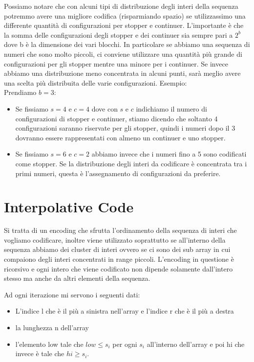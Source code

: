 \documentclass[14pt]{extreport}
\begin{document}
Possiamo notare che con alcuni tipi di distribuzione degli interi della sequenza potremmo avere una migliore codifica (risparmiando spazio) se utilizzassimo una differente quantità di configurazioni per stopper e continuer.
L'importante è che la somma delle configurazioni degli stopper e dei continuer sia sempre pari a $2^b$ dove b è la dimensione dei vari blocchi.
In particolare se abbiamo una sequenza di numeri che sono molto piccoli, ci conviene utilizzare una quantità più grande di configurazioni per gli stopper mentre una minore per i continuer.
Se invece abbiamo una distribuzione meno concentrata in alcuni punti, sarà meglio avere una scelta più distribuita delle varie configurazioni. 
Esempio:\\
Prendiamo $b=3$:
\begin{itemize}
\item Se fissiamo $s=4$ e $c=4$ dove con $s$ e $c$ indichiamo il numero di configurazioni di stopper e continuer, stiamo dicendo che soltanto 4 configurazioni saranno riservate per gli stopper, quindi i numeri dopo il 3 dovranno essere rappresentati con almeno un continuer e uno stopper.
\item Se fissiamo $s=6$ e $c=2$ abbiamo invece che i numeri fino a 5 sono codificati come stopper. Se la distribuzione degli interi da codificare è concentrata tra i primi numeri, questa è l'assegnamento di configurazioni da preferire.
\end{itemize}

\section{Interpolative Code}

Si tratta di un encoding che sfrutta l'ordinamento della sequenza di interi che vogliamo codificare, inoltre viene utilizzato soprattutto se all'interno della sequenza abbiamo dei cluster di interi ovvero se ci sono dei sub array in cui compaiono degli interi concentrati in range piccoli.
L'encoding in questione è ricorsivo e ogni intero che viene codificato non dipende solamente dall'intero stesso ma anche da altri elementi della sequenza.

Ad ogni iterazione mi servono i seguenti dati:

\begin{itemize}
\item L'indice l che è il più a sinistra nell'array e l'indice r che è il più a destra
\item la lunghezza n dell'array
\item l'elemento low tale che $low \leq s_i$ per ogni $s_i$ all'interno dell'array e poi hi che invece è tale che $hi \geq s_i$.
\end{itemize}
\end{document}

